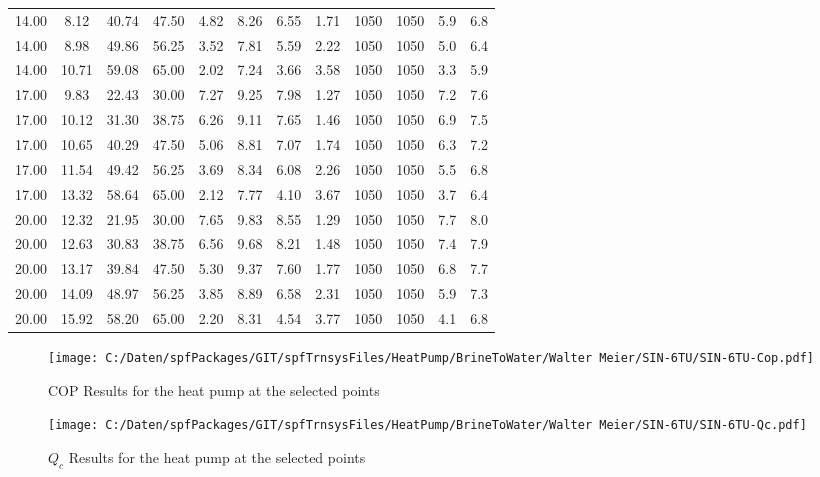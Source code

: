 \documentclass[english]{SPFShortReport}
\begin{document}
\begin{table}[!ht]
\begin{small}
\begin{center}
{\begin{tabular}{l | c c c c c c c c c c c }
14.00 & 8.12 & 40.74 & 47.50 & 4.82 & 8.26 & 6.55 & 1.71 & 1050 & 1050 & 5.9 & 6.8\\ 
14.00 & 8.98 & 49.86 & 56.25 & 3.52 & 7.81 & 5.59 & 2.22 & 1050 & 1050 & 5.0 & 6.4\\ 
14.00 & 10.71 & 59.08 & 65.00 & 2.02 & 7.24 & 3.66 & 3.58 & 1050 & 1050 & 3.3 & 5.9\\ 
17.00 & 9.83 & 22.43 & 30.00 & 7.27 & 9.25 & 7.98 & 1.27 & 1050 & 1050 & 7.2 & 7.6\\ 
17.00 & 10.12 & 31.30 & 38.75 & 6.26 & 9.11 & 7.65 & 1.46 & 1050 & 1050 & 6.9 & 7.5\\ 
17.00 & 10.65 & 40.29 & 47.50 & 5.06 & 8.81 & 7.07 & 1.74 & 1050 & 1050 & 6.3 & 7.2\\ 
17.00 & 11.54 & 49.42 & 56.25 & 3.69 & 8.34 & 6.08 & 2.26 & 1050 & 1050 & 5.5 & 6.8\\ 
17.00 & 13.32 & 58.64 & 65.00 & 2.12 & 7.77 & 4.10 & 3.67 & 1050 & 1050 & 3.7 & 6.4\\ 
20.00 & 12.32 & 21.95 & 30.00 & 7.65 & 9.83 & 8.55 & 1.29 & 1050 & 1050 & 7.7 & 8.0\\ 
20.00 & 12.63 & 30.83 & 38.75 & 6.56 & 9.68 & 8.21 & 1.48 & 1050 & 1050 & 7.4 & 7.9\\ 
20.00 & 13.17 & 39.84 & 47.50 & 5.30 & 9.37 & 7.60 & 1.77 & 1050 & 1050 & 6.8 & 7.7\\ 
20.00 & 14.09 & 48.97 & 56.25 & 3.85 & 8.89 & 6.58 & 2.31 & 1050 & 1050 & 5.9 & 7.3\\ 
20.00 & 15.92 & 58.20 & 65.00 & 2.20 & 8.31 & 4.54 & 3.77 & 1050 & 1050 & 4.1 & 6.8\\ 
\hline
\hline
\end{tabular}
}
\label{ResultsTable}
\end{center}
\end{small}
\end{table}
\begin{figure}[!ht]
\begin{center}
\texttt{[image: C:/Daten/spfPackages/GIT/spfTrnsysFiles/HeatPump/BrineToWater/Walter Meier/SIN-6TU/SIN-6TU-Cop.pdf]}
\caption{COP Results for the heat pump at the selected points}
\label{COPFig}
\end{center}
\end{figure}
\begin{figure}[!ht]
\begin{center}
\texttt{[image: C:/Daten/spfPackages/GIT/spfTrnsysFiles/HeatPump/BrineToWater/Walter Meier/SIN-6TU/SIN-6TU-Qc.pdf]}
\caption{$Q_c$ Results for the heat pump at the selected points}
\label{QcFig}
\end{center}
\end{figure}
\end{document}
